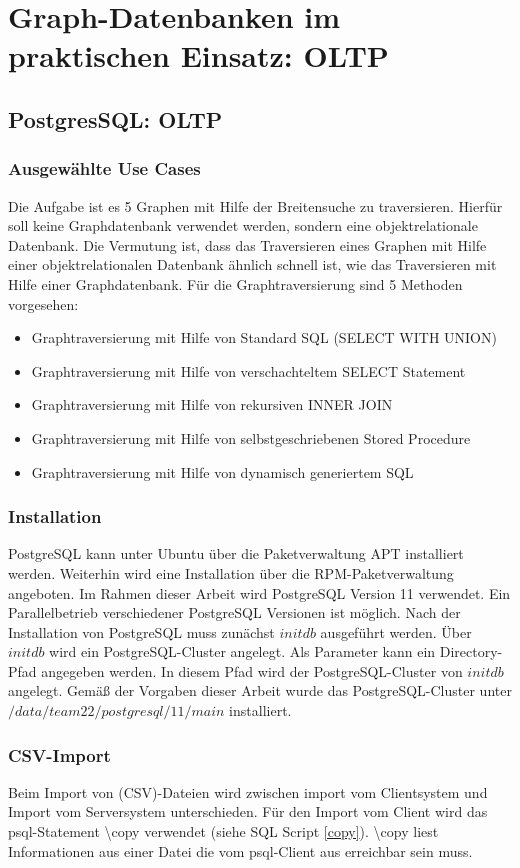 \chapter{Graph-Datenbanken im praktischen Einsatz: \ac{OLTP}}
\section{PostgresSQL: OLTP}
\subsection{Ausgewählte Use Cases}
Die Aufgabe ist es 5 Graphen mit Hilfe der Breitensuche zu traversieren. Hierfür soll keine Graphdatenbank verwendet werden, sondern eine objektrelationale Datenbank.
Die Vermutung ist, dass das Traversieren eines Graphen mit Hilfe einer objektrelationalen Datenbank ähnlich schnell ist, wie das Traversieren mit Hilfe einer Graphdatenbank.
Für die Graphtraversierung sind 5 Methoden vorgesehen:
\begin{itemize}
    \item Graphtraversierung mit Hilfe von Standard \ac{SQL} (SELECT WITH UNION)
    \item Graphtraversierung mit Hilfe von verschachteltem SELECT Statement
    \item Graphtraversierung mit Hilfe von rekursiven INNER JOIN
    \item Graphtraversierung mit Hilfe von selbstgeschriebenen Stored Procedure
    \item Graphtraversierung mit Hilfe von dynamisch generiertem \ac{SQL}
\end{itemize}
\subsection{Installation}
PostgreSQL kann unter Ubuntu über die Paketverwaltung APT installiert werden. Weiterhin wird eine Installation über die RPM-Paketverwaltung angeboten. Im Rahmen dieser Arbeit wird PostgreSQL Version 11 verwendet. Ein Parallelbetrieb verschiedener PostgreSQL Versionen ist möglich. 
Nach der Installation von PostgreSQL muss zunächst $initdb$ ausgeführt werden. Über $initdb$ wird ein PostgreSQL-Cluster angelegt. Als Parameter kann ein Directory-Pfad angegeben werden. In diesem Pfad wird der PostgreSQL-Cluster von $initdb$ angelegt.
Gemäß der Vorgaben dieser Arbeit wurde das PostgreSQL-Cluster unter $/data/team22/postgresql/11/main$ installiert.
\subsection{CSV-Import}
Beim Import von (CSV)-Dateien wird zwischen import vom Clientsystem und  Import vom Serversystem unterschieden. 
Für den Import vom Client wird das psql-Statement \textbackslash copy verwendet (siehe SQL Script \ref{copy}). \textbackslash copy liest Informationen aus einer Datei die vom psql-Client aus erreichbar sein muss. \cite{postgres2018}

